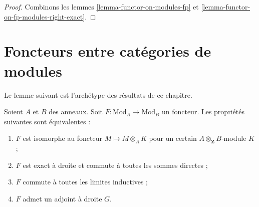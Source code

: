 \begin{proof}
Combinons les lemmes \ref{lemma-functor-on-modules-fp} et
\ref{lemma-functor-on-fp-modules-right-exact}.
\end{proof}






\section{Foncteurs entre catégories de modules}
\label{section-functors}

\noindent
Le lemme suivant est l'archétype des résultats de ce chapitre.

\begin{lemma}
\label{lemma-functor}
Soient $A$ et $B$ des anneaux. Soit $F : \text{Mod}_A \to \text{Mod}_B$
un foncteur. Les propriétés suivantes sont équivalentes :
\begin{enumerate}
\item $F$ est isomorphe au foncteur $M \mapsto M \otimes_A K$
pour un certain $A \otimes_\mathbf{Z} B$-module $K$ ;
\item $F$ est exact à droite et commute à toutes les sommes directes ;
\item $F$ commute à toutes les limites inductives ;
\item $F$ admet un adjoint à droite $G$.
\end{enumerate}
\end{lemma}

